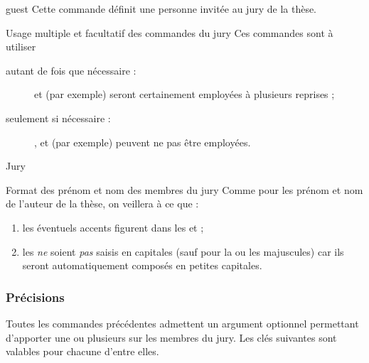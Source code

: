 \begin{docCommand}{guest}{}
  Cette commande définit une personne invitée au jury de la thèse.
\end{docCommand}
%
\begin{dbwarning}{Usage multiple et facultatif des commandes du
    jury}{}
  Ces commandes sont à utiliser
  \begin{description}
  \item[autant de fois que nécessaire :]
     et  (par exemple) seront
    certainement employées à plusieurs reprises ;
  \item[seulement si nécessaire :]
    ,  et  (par
    exemple) peuvent ne pas être employées.
  \end{description}
\end{dbwarning}

\begin{dbexample}{Jury}{}
\begin{bodycode}
%
%
\end{bodycode}
\end{dbexample}

\begin{dbwarning}{Format des prénom et nom des membres du jury}{}
  Comme pour les prénom et nom de l'auteur de la thèse, on veillera à ce que :
  \begin{enumerate}
  \item les éventuels accents figurent dans les  et ;
  \item les  \emph{ne} soient \emph{pas} saisis en capitales (sauf
    pour la ou les majuscules) car ils seront automatiquement composés en
    petites capitales.
  \end{enumerate}
\end{dbwarning}

\subsubsection{Précisions}\label{sec:options-staff}

Toutes les commandes précédentes admettent un argument optionnel
permettant d'apporter une ou plusieurs  sur les
membres du jury. Les clés suivantes sont valables pour chacune
d'entre elles.

